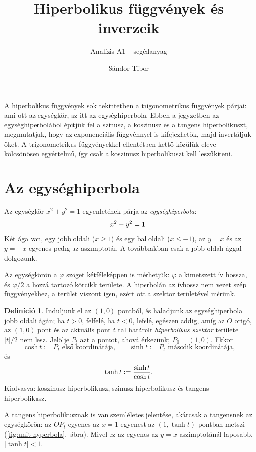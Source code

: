 \documentclass[11pt]{scrartcl}
\title{Hiperbolikus függvények és inverzeik}
\subtitle{Analízis A1 -- segédanyag}
\author{Sándor Tibor}
\date{}
\theoremstyle{definition}
\newtheorem{definition}{Definíció}
\theoremstyle{remark}
\begin{document}
\maketitle

A hiperbolikus függvények sok tekintetben a trigonometrikus függvények párjai:
ami ott az egységkör, az itt az egységhiperbola. Ebben a jegyzetben az
egységhiperbolából építjük fel a szinusz, a koszinusz és a tangens
hiperbolikuszt, megmutatjuk, hogy az exponenciális függvénnyel is kifejezhetők,
majd invertáljuk őket. A trigonometrikus függvényekkel ellentétben kettő
közülük eleve kölcsönösen egyértelmű, így csak a koszinusz hiperbolikuszt kell
leszűkíteni.

\section{Az egységhiperbola}

Az egységkör $x^2 + y^2 = 1$ egyenletének párja az \emph{egységhiperbola}:
\[
	x^2 - y^2 = 1\text.
\]
Két ága van, egy jobb oldali ($x \ge 1$) és egy bal oldali ($x \le -1$), az
$y = x$ és az $y = -x$ egyenes pedig az aszimptotái. A továbbiakban csak a jobb
oldali ággal dolgozunk.

Az egységkörön a $\varphi$ szöget kétféleképpen is mérhetjük: $\varphi$ a
kimetszett ív hossza, és $\varphi / 2$ a hozzá tartozó körcikk területe.
A hiperbolán az ívhossz nem vezet szép függvényekhez, a terület viszont igen,
ezért ott a szektor területével mérünk.

\begin{definition}
	Induljunk el az $(1, 0)$ pontból, és haladjunk az egységhiperbola jobb
	oldali ágán; ha $t > 0$, felfelé, ha $t < 0$, lefelé, egészen addig, amíg
	az $O$ origó, az $(1, 0)$ pont és az aktuális pont által határolt
	\emph{hiperbolikus szektor} területe $|t|/2$ nem lesz. Jelölje $P_t$
	azt a pontot, ahová érkezünk; $P_0 = (1, 0)$. Ekkor
	\[
		\cosh t := P_t \text{ első koordinátája,} \qquad
		\sinh t := P_t \text{ második koordinátája,}
	\]
	és
	\[
		\tanh t := \frac{\sinh t}{\cosh t}\text.
	\]
	Kiolvasva: koszinusz hiperbolikusz, szinusz hiperbolikusz és tangens
	hiperbolikusz.
\end{definition}

A tangens hiperbolikusznak is van szemléletes jelentése, akárcsak a tangensnek
az egységkörön: az $OP_t$ egyenes az $x = 1$ egyenest az $(1, \tanh t)$
pontban metszi (\ref{fig:unit-hyperbola}.~ábra). Mivel ez az egyenes az
$y = x$ aszimptotánál laposabb, $|\tanh t| < 1$.
\end{document}
